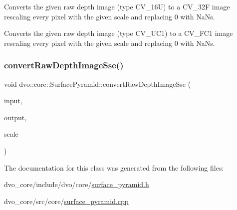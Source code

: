Converts the given raw depth image (type C\+V\+\_\+16U) to a C\+V\+\_\+32F image rescaling every pixel with the given scale and replacing 0 with Na\+Ns.

Converts the given raw depth image (type C\+V\+\_\+U\+C1) to a C\+V\+\_\+F\+C1 image rescaling every pixel with the given scale and replacing 0 with Na\+Ns. \mbox{\label{classdvo_1_1core_1_1_surface_pyramid_a227439a6f1891fdc29efaf69b1433068}} 
\subsubsection{\texorpdfstring{convert\+Raw\+Depth\+Image\+Sse()}{convertRawDepthImageSse()}}
{\footnotesize\ttfamily void dvo\+::core\+::\+Surface\+Pyramid\+::convert\+Raw\+Depth\+Image\+Sse (\begin{DoxyParamCaption}\item[{const cv\+::\+Mat \&}]{input,  }\item[{cv\+::\+Mat \&}]{output,  }\item[{float}]{scale }\end{DoxyParamCaption})\hspace{0.3cm}{\ttfamily [static]}}



The documentation for this class was generated from the following files\+:\begin{DoxyCompactItemize}
\item 
dvo\+\_\+core/include/dvo/core/\mbox{\hyperlink{surface__pyramid_8h}{surface\+\_\+pyramid.\+h}}\item 
dvo\+\_\+core/src/core/\mbox{\hyperlink{surface__pyramid_8cpp}{surface\+\_\+pyramid.\+cpp}}\end{DoxyCompactItemize}
